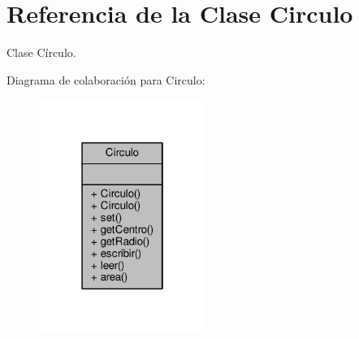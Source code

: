 \hypertarget{classCirculo}{}\section{Referencia de la Clase Circulo}
\label{classCirculo}


Clase Círculo.  




Diagrama de colaboración para Circulo\+:\nopagebreak
\begin{figure}[H]
\begin{center}
\leavevmode
\includegraphics[width=154pt]{classCirculo__coll__graph}
\end{center}
\end{figure}
